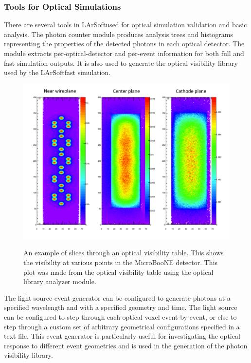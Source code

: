 \documentclass[12pt]{elsarticle}
\newcommand{\larsoft}{LArSoft}
\begin{document}
\subsubsection{Tools for Optical Simulations}

There are several tools in \larsoft used for optical simulation validation and basic analysis.  The photon counter module produces analysis trees and histograms representing the properties of the detected photons in each optical detector.  The module extracts per-optical-detector and per-event information for both full and fast simulation outputs.  It is also used to generate the optical visibility library used by the \larsoft fast simulation.

\begin{figure}[h]
\centering
\caption{An example of slices through an optical visibility table. This shows the visibility at various points
in the MicroBooNE detector.  This plot was made from the optical visibility table using the optical library
analyzer module.}
\includegraphics[width=6.0in]{./mtrls/imgs/SampleOpticalMap.pdf}
\label{fig:opticalmap}
\end{figure}

The light source event generator can be configured to generate photons at a specified wavelength and with a specified geometry and time.  The light source can be configured to step through each optical voxel event-by-event, or else to step through a custom set of arbitrary geometrical configurations specified in a text file.  This event generator is particularly useful for investigating the optical response to different event geometries and is used in the generation of the photon visibility library.
\end{document}

